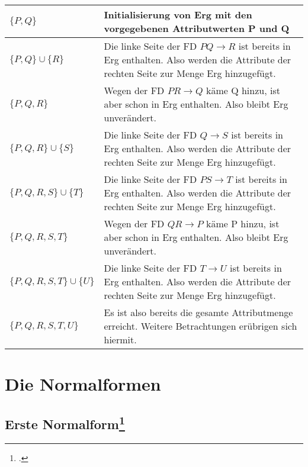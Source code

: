 \documentclass{lehramt-informatik}
\begin{document}
\noindent
\begin{tabularx}{\linewidth}{lX}
$\{P, Q\}$ &
Initialisierung von Erg mit den vorgegebenen Attributwerten P und Q
\\\hline

$\{P, Q\} \cup \{R\}$  &
Die linke Seite der FD $P Q \rightarrow R$ ist bereits in Erg enthalten.
Also werden die Attribute der rechten Seite zur Menge Erg hinzugefügt.
\\\hline

$\{P, Q, R\}$ &
Wegen der FD $PR \rightarrow Q$ käme Q hinzu, ist aber schon in Erg
enthalten. Also bleibt Erg unverändert.
\\\hline

$\{P, Q, R\} \cup \{S\}$ &
Die linke Seite der FD $Q \rightarrow S$ ist bereits in Erg enthalten.
Also werden die Attribute der rechten Seite zur Menge Erg hinzugefügt.
\\\hline

$\{P, Q, R, S\} \cup \{T\}$ &
Die linke Seite der FD $PS \rightarrow T$ ist bereits in Erg enthalten.
Also werden die Attribute der rechten Seite zur Menge Erg hinzugefügt.
\\\hline

$\{P, Q, R, S, T\}$ &
Wegen der FD $QR \rightarrow P$ käme P hinzu, ist aber schon in Erg
enthalten. Also bleibt Erg unverändert.
\\\hline

$\{P, Q, R, S, T\} \cup \{U\}$ &
Die linke Seite der FD $T \rightarrow U$ ist bereits in Erg enthalten.
Also werden die Attribute der rechten Seite zur Menge Erg hinzugefügt.
\\\hline

$\{P, Q, R, S, T, U\}$ &
Es ist also bereits die gesamte Attributmenge erreicht. Weitere
Betrachtungen erübrigen sich hiermit.
\\\hline
\end{tabularx}

\section{Die Normalformen}

%

\subsection{Erste Normalform\footcite[Seite 195]{winter}}
\end{document}

